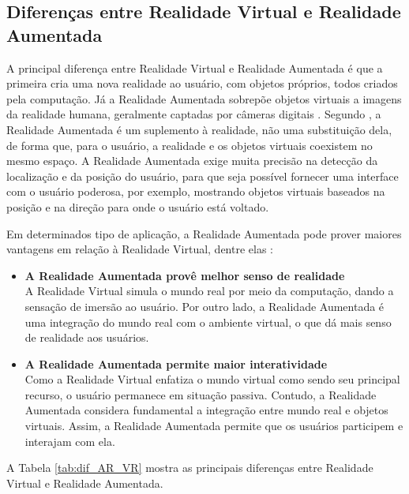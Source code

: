 \subsection{Diferenças entre Realidade Virtual e Realidade Aumentada}

A principal diferença entre Realidade Virtual e Realidade Aumentada
é que a primeira cria uma nova realidade ao usuário, com objetos
próprios, todos criados pela computação. Já a Realidade Aumentada
sobrepõe objetos virtuais a imagens da realidade humana, geralmente
captadas por câmeras digitais \cite{ARCADE, TrendsInAR}.
Segundo \cite{SurveyAR, AdvancesAR}, a Realidade Aumentada é
um suplemento à realidade, não uma substituição dela, de forma que,
para o usuário, a realidade e os objetos virtuais coexistem no mesmo
espaço. A Realidade Aumentada exige muita precisão na detecção da
localização e da posição do usuário, para que seja possível fornecer
uma interface com o usuário poderosa, por exemplo, mostrando objetos
virtuais baseados na posição e na direção para onde o usuário está
voltado.

Em determinados tipo de aplicação, a Realidade Aumentada pode prover maiores vantagens em 
relação à Realidade Virtual, dentre elas \cite{ARFeatureMaching}:

\begin{itemize}
    \item \textbf{A Realidade Aumentada provê melhor senso de realidade}\\
    
    A Realidade Virtual simula o mundo real por meio da computação, dando a
    sensação de imersão ao usuário. Por outro lado, a Realidade Aumentada 
    é uma integração do mundo real com o ambiente virtual, o que dá mais senso
    de realidade aos usuários.
    
    \item \textbf{A Realidade Aumentada permite maior interatividade}\\
    
    Como a Realidade Virtual enfatiza o mundo virtual como sendo seu principal
    recurso, o usuário permanece em situação passiva. Contudo, a Realidade Aumentada
    considera fundamental a integração entre mundo real e objetos virtuais. Assim,
    a Realidade Aumentada permite que os usuários participem e interajam com ela.
\end{itemize}

A Tabela \ref{tab:dif_AR_VR} mostra as principais diferenças entre
Realidade Virtual e Realidade Aumentada.

